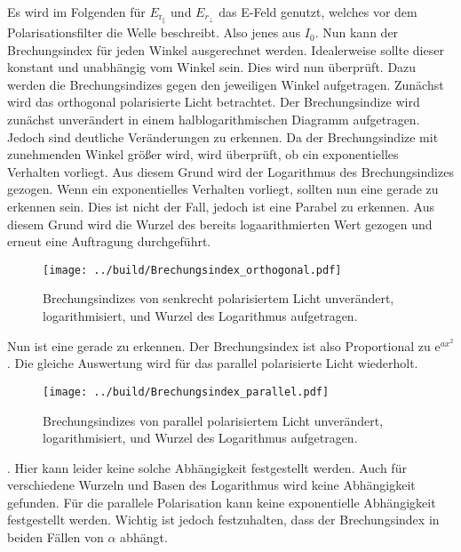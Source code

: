 \noindent Es wird im Folgenden für $E_{\text{r}_\parallel}$ und $E_{r_\bot}$ das E-Feld genutzt, welches vor dem Polarisationsfilter die Welle beschreibt. Also jenes aus $I_0$.
Nun kann der Brechungsindex für jeden Winkel ausgerechnet werden. Idealerweise sollte dieser konstant und unabhängig vom Winkel sein. Dies wird nun überprüft. Dazu werden 
die Brechungsindizes gegen den jeweiligen Winkel aufgetragen. Zunächst wird das orthogonal polarisierte Licht betrachtet.
Der Brechungsindize wird zunächst unverändert in einem halblogarithmischen Diagramm aufgetragen. Jedoch sind deutliche Veränderungen zu erkennen. 
Da der Brechungsindize mit zunehmenden Winkel größer wird, wird überprüft, ob ein exponentielles Verhalten vorliegt. Aus diesem Grund wird der Logarithmus 
des Brechungsindizes gezogen. Wenn ein exponentielles Verhalten vorliegt, sollten nun eine gerade zu erkennen sein. Dies ist nicht der Fall, jedoch ist eine Parabel zu erkennen. 
Aus diesem Grund wird die Wurzel des bereits logaarithmierten Wert gezogen und erneut eine Auftragung durchgeführt. 

\begin{figure}
    \centering
    \texttt{[image: ../build/Brechungsindex\_orthogonal.pdf]}
    \caption{Brechungsindizes von senkrecht polarisiertem Licht unverändert, logarithmisiert, und Wurzel des Logarithmus aufgetragen.}
\end{figure}

\noindent Nun ist eine gerade zu erkennen. Der Brechungsindex ist also Proportional zu $\text{e}^{ax^2}$. Die gleiche Auswertung wird für das parallel polarisierte Licht 
wiederholt. 

\begin{figure}
    \centering
    \texttt{[image: ../build/Brechungsindex\_parallel.pdf]}
    \caption{Brechungsindizes von parallel polarisiertem Licht unverändert, logarithmisiert, und Wurzel des Logarithmus aufgetragen.}
\end{figure}

\noindent. Hier kann leider keine solche Abhängigkeit festgestellt werden. Auch für verschiedene Wurzeln und Basen des Logarithmus wird keine Abhängigkeit gefunden.
Für die parallele Polarisation kann keine exponentielle Abhängigkeit festgestellt werden. 
Wichtig ist jedoch festzuhalten, dass der Brechungsindex in beiden Fällen von $\alpha$ abhängt.









    
